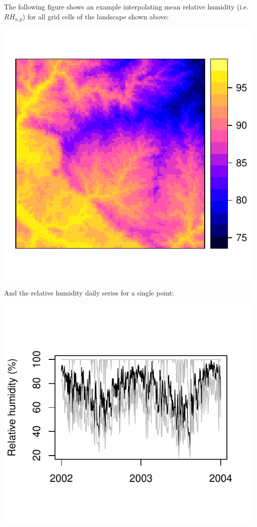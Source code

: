 \documentclass[11pt,a4paper]{article}
\begin{document}
The following figure shows an example interpolating mean relative humidity (i.e. $RH_{a,p}$) for all grid cells of the landscape shown above:
\begin{center}
\includegraphics{Meteorology-013}
\end{center}
And the relative humidity daily series for a single point:
\begin{center}
\includegraphics{Meteorology-014}
\end{center}
\end{document}

